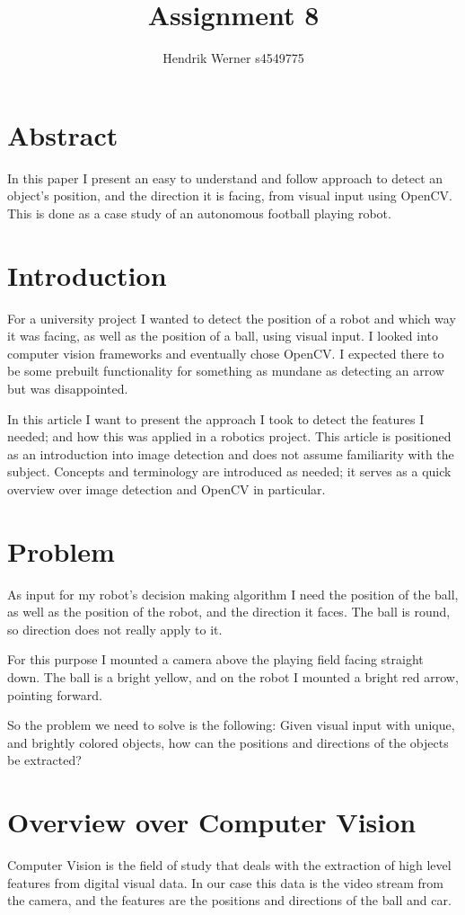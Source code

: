 \documentclass[12pt, a4paper]{article}
\title{Assignment 8}
\author{Hendrik Werner s4549775}
\begin{document}
\maketitle

\section{Abstract}
In this paper I present an easy to understand and follow approach to detect an object's position, and the direction it is facing, from visual input using OpenCV. This is done as a case study of an autonomous football playing robot.

\section{Introduction}
For a university project I wanted to detect the position of a robot and which way it was facing, as well as the position of a ball, using visual input. I looked into computer vision frameworks and eventually chose OpenCV. I expected there to be some prebuilt functionality for something as mundane as detecting an arrow but was disappointed.

In this article I want to present the approach I took to detect the features I needed; and how this was applied in a robotics project. This article is positioned as an introduction into image detection and does not assume familiarity with the subject. Concepts and terminology are introduced as needed; it serves as a quick overview over image detection and OpenCV in particular.

\section{Problem}
As input for my robot's decision making algorithm I need the position of the ball, as well as the position of the robot, and the direction it faces. The ball is round, so direction does not really apply to it.

For this purpose I mounted a camera above the playing field facing straight down. The ball is a bright yellow, and on the robot I mounted a bright red arrow, pointing forward.

So the problem we need to solve is the following: Given visual input with unique, and brightly colored objects, how can the positions and directions of the objects be extracted?

\section{Overview over Computer Vision}
Computer Vision is the field of study that deals with the extraction of high level features from digital visual data. In our case this data is the video stream from the camera, and the features are the positions and directions of the ball and car.
\end{document}
